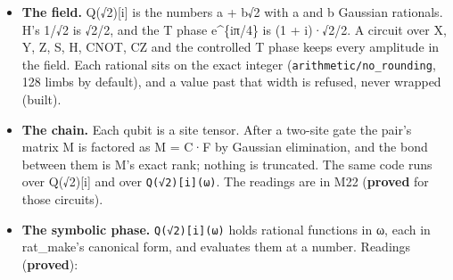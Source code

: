 \begin{itemize}
\item \textbf{The field.} Q(√2)[i] is the numbers a + b√2 with a and b Gaussian rationals. H's 1/√2 is √2/2, and the T phase e\textasciicircum{}\{iπ/4\} is (1 + i)·√2/2. A circuit over X, Y, Z, S, H, CNOT, CZ and the controlled T phase keeps every amplitude in the field. Each rational sits on the exact integer (\texttt{arithmetic/\allowbreak{}no\_\allowbreak{}rounding}, 128 limbs by default), and a value past that width is refused, never wrapped (built).
\item \textbf{The chain.} Each qubit is a site tensor. After a two-site gate the pair's matrix M is factored as M = C·F by Gaussian elimination, and the bond between them is M's exact rank; nothing is truncated. The same code runs over Q(√2)[i] and over \texttt{Q(√2)[i](ω)}. The readings are in M22 (\textbf{proved} for those circuits).
\item \textbf{The symbolic phase.} \texttt{Q(√2)[i](ω)} holds rational functions in ω, each in rat\_\allowbreak{}make's canonical form, and evaluates them at a number. Readings (\textbf{proved}):


\end{itemize}
